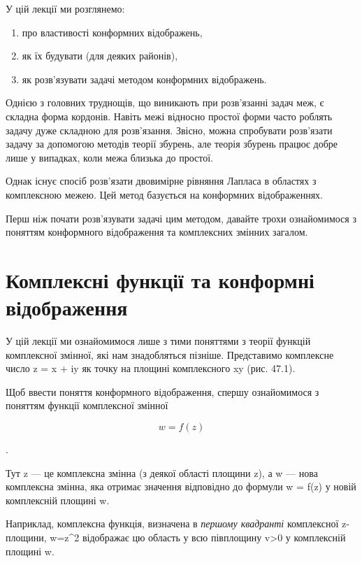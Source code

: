 \documentclass[
]{article}
\begin{document}
У цій лекції ми розглянемо:

\begin{enumerate}
\def\labelenumi{\arabic{enumi})}
\item
  про властивості конформних відображень,
\item
  як їх будувати (для деяких районів),
\item
  як розв'язувати задачі методом конформних відображень.
\end{enumerate}

Однією з головних труднощів, що виникають при розв'язанні задач меж, є
складна форма кордонів. Навіть межі відносно простої форми часто роблять
задачу дуже складною для розв'язання. Звісно, можна спробувати
розв'язати задачу за допомогою методів теорії збурень, але теорія
збурень працює добре лише у випадках, коли межа близька до простої.

Однак існує спосіб розв'язати двовимірне рівняння Лапласа в областях з
комплексною межею. Цей метод базується на конформних відображеннях.

Перш ніж почати розв'язувати задачі цим методом, давайте трохи
ознайомимося з поняттям конформного відображення та комплексних змінних
загалом.

\section{Комплексні функції та конформні
відображення}\label{ux43aux43eux43cux43fux43bux435ux43aux441ux43dux456-ux444ux443ux43dux43aux446ux456ux457-ux442ux430-ux43aux43eux43dux444ux43eux440ux43cux43dux456-ux432ux456ux434ux43eux431ux440ux430ux436ux435ux43dux43dux44f}

У цій лекції ми ознайомимося лише з тими поняттями з теорії функцій
комплексної змінної, які нам знадобляться пізніше. Представимо
комплексне число z = x + iy як точку на площині комплексного xy (рис.
47.1).

Щоб ввести поняття конформного відображення, спершу ознайомимося з
поняттям функції комплексної змінної

\[
w = f(z)
\]

.

Тут z --- це комплексна змінна (з деякої області площини z), а w ---
нова комплексна змінна, яка отримає значення відповідно до формули w =
f(z) у новій комплексній площині w.

Наприклад, комплексна функція, визначена в \emph{першому квадранті}
комплексної z-площини, w=z\^{}2 відображає цю область у всю півплощину
v\textgreater0 у комплексній площині w.
\end{document}
